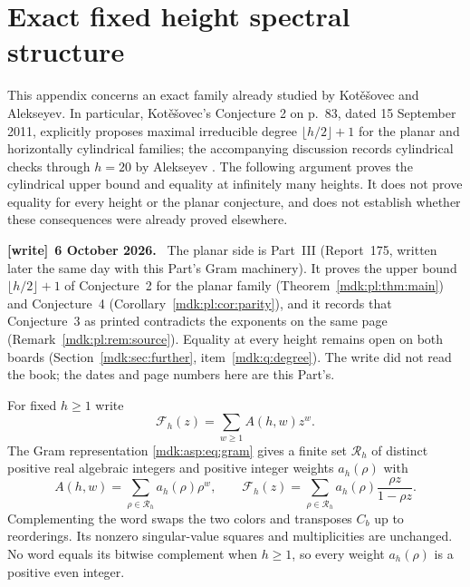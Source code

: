 \documentclass[11pt,letterpaper]{article}
\numberwithin{equation}{section}
\theoremstyle{remark}\newtheorem{remark}[theorem]{Remark}
\newenvironment{writenote}[1][]{\par\smallskip\begingroup\small
 \noindent\textbf{[write]}\if\relax\detokenize{#1}\relax\else~\textbf{#1.}\fi\ }%
 {\par\endgroup\smallskip}
\begin{document}
\section{Exact fixed height spectral structure}\label{mdk:asp:sec:structure}
This appendix concerns an exact family already studied by Kot\v{e}\v{s}ovec and Alekseyev. In particular, Kot\v{e}\v{s}ovec's Conjecture 2 on p.~83, dated 15 September 2011, explicitly proposes maximal irreducible degree $\lfloor h/2\rfloor+1$ for the planar and horizontally cylindrical families; the accompanying discussion records cylindrical checks through $h=20$ by Alekseyev \cite[pp.~82--83]{kotesovec}. The following argument proves the cylindrical upper bound and equality at infinitely many heights. It does not prove equality for every height or the planar conjecture, and does not establish whether these consequences were already proved elsewhere.
\begin{writenote}[6 October 2026]
The planar side is Part~III (Report~175, written later the same day with this Part's Gram machinery). It proves the upper bound $\lfloor h/2\rfloor+1$ of Conjecture~2 for the planar family (Theorem~\ref{mdk:pl:thm:main}) and Conjecture~4 (Corollary~\ref{mdk:pl:cor:parity}), and it records that Conjecture~3 as printed contradicts the exponents on the same page (Remark~\ref{mdk:pl:rem:source}). Equality at every height remains open on both boards (Section~\ref{mdk:sec:further}, item~\ref{mdk:q:degree}). The write did not read the book; the dates and page numbers here are this Part's.
\end{writenote}

For fixed $h\ge1$ write
\[
\mathcal F_h(z)=\sum_{w\ge1}A(h,w)z^w.
\]
The Gram representation \eqref{mdk:asp:eq:gram} gives a finite set $\mathcal R_h$ of distinct positive real algebraic integers and positive integer weights $a_h(\rho)$ with
\begin{equation}\label{mdk:asp:eq:spectralpowers}
A(h,w)=\sum_{\rho\in\mathcal R_h}a_h(\rho)\rho^w,\qquad
\mathcal F_h(z)=\sum_{\rho\in\mathcal R_h}a_h(\rho)\frac{\rho z}{1-\rho z}.
\end{equation}
Complementing the word swaps the two colors and transposes $C_b$ up to reorderings. Its nonzero singular-value squares and multiplicities are unchanged. No word equals its bitwise complement when $h\ge1$, so every weight $a_h(\rho)$ is a positive even integer.
\end{document}
